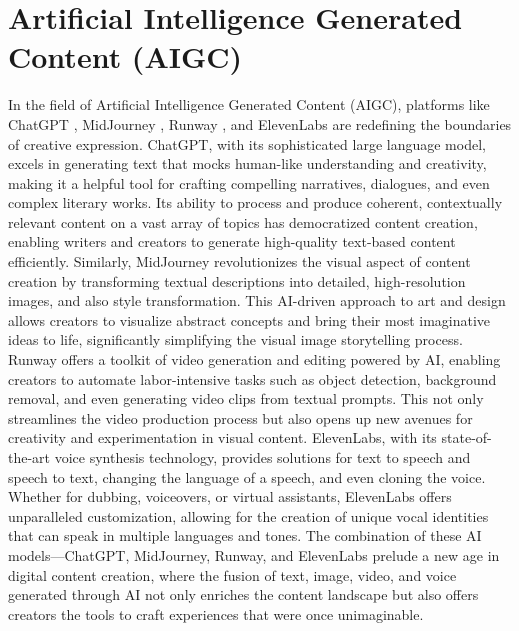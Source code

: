 \documentclass[11pt,a4paper,oneside]{report}
\begin{document}
\section{Artificial Intelligence Generated Content (AIGC)}

In the field of Artificial Intelligence Generated Content (AIGC), platforms like ChatGPT \cite{leiter2023chatgpt} \cite{openai2023gpt}, MidJourney \cite{MidjourneyExplore}, Runway \cite{runwayml}, and ElevenLabs \cite{elevenlabs} are redefining the boundaries of creative expression. 
ChatGPT, with its sophisticated large language model, excels in generating text that mocks human-like understanding and creativity, making it a helpful tool for crafting compelling narratives, dialogues, and even complex literary works. 
Its ability to process and produce coherent, contextually relevant content on a vast array of topics has democratized content creation, enabling writers and creators to generate high-quality text-based content efficiently. 
Similarly, MidJourney revolutionizes the visual aspect of content creation by transforming textual descriptions into detailed, high-resolution images, and also style transformation.
This AI-driven approach to art and design allows creators to visualize abstract concepts and bring their most imaginative ideas to life, significantly simplifying the visual image storytelling process. 
Runway offers a toolkit of video generation and editing powered by AI, enabling creators to automate labor-intensive tasks such as object detection, background removal, and even generating video clips from textual prompts. 
This not only streamlines the video production process but also opens up new avenues for creativity and experimentation in visual content. 
ElevenLabs, with its state-of-the-art voice synthesis technology, provides solutions for text to speech and speech to text, changing the language of a speech, and even cloning the voice.
Whether for dubbing, voiceovers, or virtual assistants, ElevenLabs offers unparalleled customization, allowing for the creation of unique vocal identities that can speak in multiple languages and tones. 
The combination of these AI models—ChatGPT, MidJourney, Runway, and ElevenLabs prelude a new age in digital content creation, where the fusion of text, image, video, and voice generated through AI not only enriches the content landscape but also offers creators the tools to craft experiences that were once unimaginable.
\end{document}
